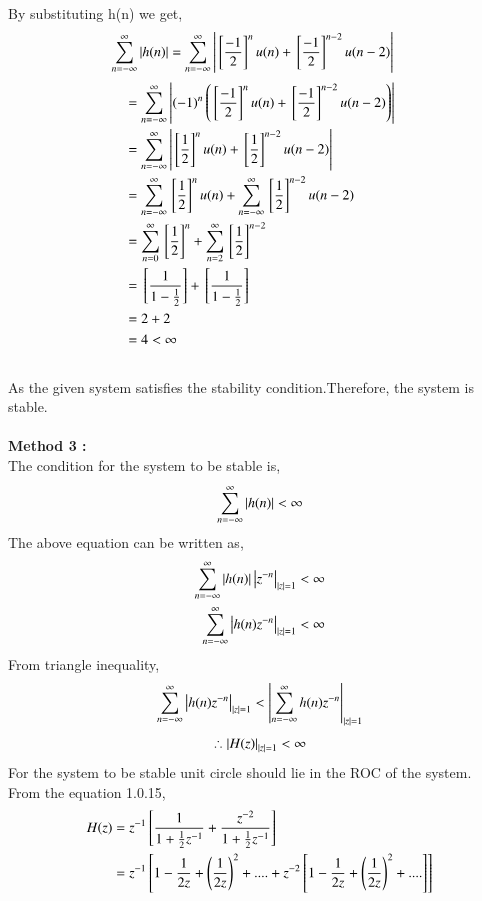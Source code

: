 \documentclass[journal,12pt,twocolumn]{IEEEtran}
\begin{document}
By substituting h(n) we get,\\
\begin{align}
\sum_{n=-\infty}^{\infty} \left\vert h(n)\right\vert &= \sum_{n=-\infty}^{\infty}\left\vert{}\left[\frac{-1}{2}\right]^nu(n) + {}\left[\frac{-1}{2}\right]^{n-2}u(n-2)\right\vert
\end{align}
\begin{align}
&= 
\sum_{n=-\infty}^{\infty}\left\vert(-1)^n \left( {}\left[\frac{-1}{2}\right]^nu(n) + {}\left[\frac{-1}{2}\right]^{n-2}u(n-2) \right)\right\vert  \\
&= 
\sum_{n=-\infty}^{\infty}\left\vert{}\left[\frac{1}{2}\right]^nu(n) + {}\left[\frac{1}{2}\right]^{n-2}u(n-2)\right\vert \\
&=
\sum_{n=-\infty}^{\infty}{}\left[\frac{1}{2}\right]^nu(n)+\sum_{n=-\infty}^{\infty}{}\left[\frac{1}{2}\right]^{n-2}u(n-2)\\
&=
\sum_{n=0}^{\infty}{}\left[\frac{1}{2}\right]^n+\sum_{n=2}^{\infty}{}\left[\frac{1}{2}\right]^{n-2}\\
&=
{}\left[\frac{1}{1-\frac{1}{2}}\right]+{}\left[\frac{1}{1-\frac{1}{2}}\right]\\
&=
2+2\\
&=
4 < \infty
\end{align}\\
As the given system satisfies the stability condition.Therefore, the system is stable.\\
\\
\textbf{Method 3 :}
\\
The condition for the system to be stable is,
\begin{align}
    \sum_{n=-\infty}^{\infty}\left\vert h(n)\right\vert<\infty
\end{align}
The above equation can be written as,
\begin{align}
    \sum_{n=-\infty}^{\infty}\left\vert h(n)\right\vert\left\vert z^{-n}\right\vert_{\left\vert z\right\vert=1}<\infty\\
    \sum_{n=-\infty}^{\infty}\left\vert h(n)z^{-n}\right\vert_{\left\vert z\right\vert=1}<\infty
\end{align}
From triangle inequality,
\begin{align}
   \sum_{n=-\infty}^{\infty}\left\vert h(n)z^{-n}\right\vert_{\left\vert z\right\vert=1}<\left\vert\sum_{n=-\infty}^{\infty}h(n)z^{-n}\right\vert_{\left\vert z\right\vert=1}
\end{align}
\begin{align}
     \therefore \left\vert H(z)\right\vert_{\left\vert z\right\vert=1}<\infty
\end{align}
For the system to be stable unit circle should lie in the ROC of the system.\\
From the equation 1.0.15,
\begin{align}
H(z) &= z^{-1}{}\left[\frac{1}{1+\frac{1}{2}z^{-1}} + \frac{z^{-2}}{1+\frac{1}{2}z^{-1}}\right]\\
&=
z^{-1}{}\left[1-\frac{1}{2z}+\left( \frac{1}{2z} \right)^{2} +.... +z^{-2}{}\left[1-\frac{1}{2z}+\left( \frac{1}{2z} \right)^{2} +....\right]\right]
\end{align}\\
\end{document}

